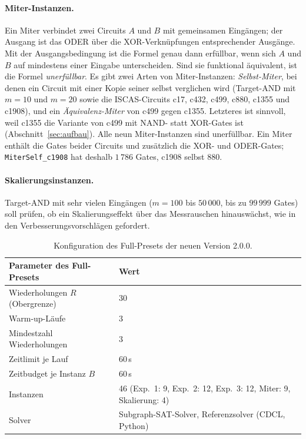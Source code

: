 \documentclass[a4paper,12pt]{article}
\theoremstyle{definition}
\begin{document}
\paragraph{Miter-Instanzen.} Ein Miter verbindet zwei Circuits $A$ und $B$ mit gemeinsamen Eingängen; der Ausgang ist das ODER über die XOR-Verknüpfungen entsprechender Ausgänge. Mit der Ausgangsbedingung ist die Formel genau dann erfüllbar, wenn sich $A$ und $B$ auf mindestens einer Eingabe unterscheiden. Sind sie funktional äquivalent, ist die Formel \emph{unerfüllbar}. Es gibt zwei Arten von Miter-Instanzen: \emph{Selbst-Miter}, bei denen ein Circuit mit einer Kopie seiner selbst verglichen wird (Target-AND mit $m=10$ und $m=20$ sowie die ISCAS-Circuits c17, c432, c499, c880, c1355 und c1908), und ein \emph{Äquivalenz-Miter} von c499 gegen c1355. Letzteres ist sinnvoll, weil c1355 die Variante von c499 mit NAND- statt XOR-Gates ist (Abschnitt~\ref{sec:aufbau}). Alle neun Miter-Instanzen sind unerfüllbar. Ein Miter enthält die Gates beider Circuits und zusätzlich die XOR- und ODER-Gates; \texttt{MiterSelf\_c1908} hat deshalb $1\,786$ Gates, c1908 selbst $880$.

\paragraph{Skalierungsinstanzen.} Target-AND mit sehr vielen Eingängen ($m = 100$ bis $50\,000$, bis zu $99\,999$ Gates) soll prüfen, ob ein Skalierungseffekt über das Messrauschen hinauswächst, wie in den Verbesserungsvorschlägen gefordert.

\begin{table}[ht]
\centering\small
\begin{tabular}{lp{9.8cm}}
\toprule
Parameter des Full-Presets & Wert \\
\midrule
Wiederholungen $R$ (Obergrenze) & 30 \\
Warm-up-Läufe & 3 \\
Mindestzahl Wiederholungen & 3 \\
Zeitlimit je Lauf & 60\,s \\
Zeitbudget je Instanz $B$ & 60\,s \\
Instanzen & 46 (Exp.~1: 9, Exp.~2: 12, Exp.~3: 12, Miter: 9, Skalierung: 4) \\
Solver & Subgraph-SAT-Solver, Referenzsolver (CDCL, Python) \\
\bottomrule
\end{tabular}
\caption{Konfiguration des Full-Presets der neuen Version 2.0.0.}
\label{tab:v2-preset}
\end{table}
\end{document}
